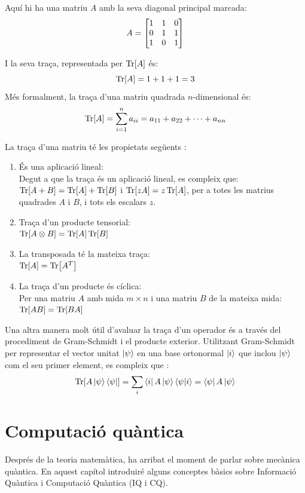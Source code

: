 Aquí hi ha una matriu $A$ amb la seva diagonal principal marcada:
$$A = 
	\begin{bmatrix}
		\tikzmarktrace{top}{1} & \tikzmarktrace{top2}{1} & 0 \\
		0 & 1 & \tikzmarktrace{bottom2}{1} \\
		\tikzmarktrace{end}{1} & 0 & \tikzmarktrace{bottom}{1}\\
	\end{bmatrix}
$$

I la seva traça, representada per $\Tr[A]$ és:
$$
\Tr[A] = 1 + 1 + 1 = 3
$$
Més formalment, la traça d'una matriu quadrada $n$-dimensional és:
$$
\Tr[A] = \sum_{i=1}^{n} a_{ii} = a_{11} + a_{22} + \cdots + a_{nn}
$$

La traça d'una matriu té les propietats següents  \cite{QCandQI:trace}:
\begin{enumerate}
	\item És una aplicació lineal: \\
	Degut a que la traça és un aplicació lineal, es compleix que:\\
	$\Tr[A+B] = \Tr[A] + \Tr[B]$ i $\Tr[zA] = z \Tr[A]$, per a totes les matrius quadrades $A$ i $B$, i tots els escalars $z$.
	\item Traça d'un producte tensorial: \\
	$\Tr[A \otimes B] = \Tr[A]\Tr[B]$
	\item La transposada té la mateixa traça: \\
	$\Tr[A]=\Tr[A^T]$
	\item La traça d'un producte és cíclica: \\
	Per una matriu $A$ amb mida $m \times n$ i una matriu $B$ de la mateixa mida:\\
	$\Tr[AB]=\Tr[BA]$
\end{enumerate}

Una altra manera molt útil d'avaluar la traça d'un operador és a través del procediment de Gram-Schmidt i el producte exterior.
Utilitzant Gram-Schmidt per representar el vector unitat $\ket{\psi}$ en una base ortonormal $\ket{i}$ que inclou $\ket{\psi}$ com el seu primer element, es compleix que \cite{QCandQI:trace}:
$$
\Tr[A\ket{\psi}\bra{\psi}] = \sum_i \bra{i}A\ket{\psi}\bra{\psi}\ket{i} = \bra{\psi}A\ket{\psi}
$$

\chapter{Computació quàntica}
Després de la teoria matemàtica, ha arribat el moment de parlar sobre mecànica quàntica. En aquest capítol introduiré alguns conceptes bàsics sobre Informació Quàntica i Computació Quàntica (IQ i CQ).

